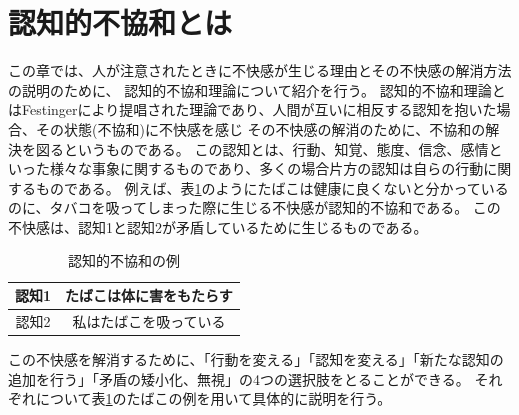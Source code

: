 \documentclass{kuisthesis}
\begin{document}
\section{認知的不協和とは} %
\label{sec: CDT}
この章では、人が注意されたときに不快感が生じる理由とその不快感の解消方法の説明のために、
認知的不協和理論について紹介を行う。
認知的不協和理論\cite{Festinger1957}とはFestingerにより提唱された理論であり、人間が互いに相反する認知を抱いた場合、その状態(不協和)に不快感を感じ
その不快感の解消のために、不協和の解決を図るというものである。
この認知とは、行動、知覚、態度、信念、感情といった様々な事象に関するものであり、多くの場合片方の認知は自らの行動に関するものである。
例えば、表\ref{fig: CDTExample}のようにたばこは健康に良くないと分かっているのに、タバコを吸ってしまった際に生じる不快感が認知的不協和である。
この不快感は、認知1と認知2が矛盾しているために生じるものである。
\begin{table}[H]
  \centering\caption{認知的不協和の例}
  \label{fig: CDTExample}

  \begin{tabular}{c|c}
      認知1 & たばこは体に害をもたらす  \\ \hline
      認知2 & 私はたばこを吸っている \\ 
  \end{tabular}
  
\end{table}
この不快感を解消するために、「行動を変える」「認知を変える」「新たな認知の追加を行う」「矛盾の矮小化、無視」の4つの選択肢をとることができる。
それぞれについて表\ref{fig: CDTExample}のたばこの例を用いて具体的に説明を行う。
\end{document}
